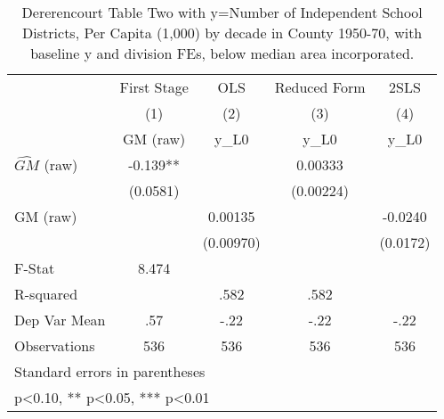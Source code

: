 \begin{table}[htbp]\centering
\def\sym#1{\ifmmode^{#1}\else\(^{#1}\)\fi}
\caption{Dererencourt Table Two with y=Number of Independent School Districts, Per Capita (1,000) by decade in County 1950-70, with baseline y and division FEs, below median area incorporated.}
\begin{tabular}{l*{4}{c}}
\toprule
                    & First Stage   &         OLS   &Reduced Form   &        2SLS   \\
                    &\multicolumn{1}{c}{(1)}&\multicolumn{1}{c}{(2)}&\multicolumn{1}{c}{(3)}&\multicolumn{1}{c}{(4)}\\
                    &\multicolumn{1}{c}{GM  (raw)}&\multicolumn{1}{c}{y\_L0}&\multicolumn{1}{c}{y\_L0}&\multicolumn{1}{c}{y\_L0}\\
\midrule
$\hat{GM}$ (raw)    &      -0.139** &               &     0.00333   &               \\
                    &    (0.0581)   &               &   (0.00224)   &               \\
\addlinespace
GM  (raw)           &               &     0.00135   &               &     -0.0240   \\
                    &               &   (0.00970)   &               &    (0.0172)   \\
\midrule
F-Stat              &       8.474   &               &               &               \\
R-squared           &               &        .582   &        .582   &               \\
Dep Var Mean        &         .57   &        -.22   &        -.22   &        -.22   \\
Observations        &         536   &         536   &         536   &         536   \\
\bottomrule
\multicolumn{5}{l}{\footnotesize Standard errors in parentheses}\\
\multicolumn{5}{l}{\footnotesize * p<0.10, ** p<0.05, *** p<0.01}\\
\end{tabular}
\end{table}
